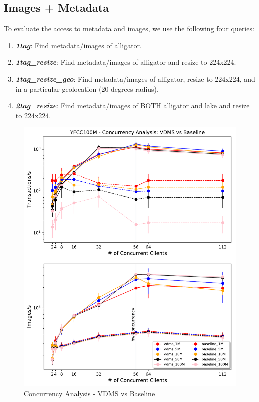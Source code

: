 \subsection{Images + Metadata}

To evaluate the access to metadata and images, we use the following four queries:
\begin{enumerate}
\item {\bf {\em 1tag}}: Find metadata/images of alligator.
\item {\bf {\em 1tag\_resize}}: Find metadata/images of alligator and resize to 224x224.
\item {\bf {\em 1tag\_resize\_geo}}: Find metadata/images of alligator, resize to 224x224, and in a particular geolocation (20 degrees radius).
\item {\bf {\em 2tag\_resize}}: Find metadata/images of BOTH alligator and lake and resize to 224x224.
\end{enumerate}

\begin{figure}[]
\centering
\includegraphics[width=\columnwidth]{figures/concurrency_comparison}
\caption{Concurrency Analysis - VDMS vs Baseline}
\label{fig:concurrency_vdms}
\end{figure}

